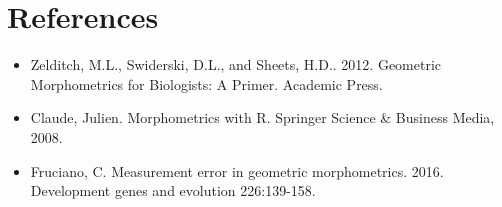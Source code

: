 \documentclass[]{book}
\providecommand{\tightlist}{%
  \setlength{\itemsep}{0pt}\setlength{\parskip}{0pt}}
\begin{document}
\section{References}\label{references-4}

\begin{itemize}
\tightlist
\item
  Zelditch, M.L., Swiderski, D.L., and Sheets, H.D.. 2012. Geometric
  Morphometrics for Biologists: A Primer. Academic Press.
\item
  Claude, Julien. Morphometrics with R. Springer Science \& Business
  Media, 2008.
\item
  Fruciano, C. Measurement error in geometric morphometrics. 2016.
  Development genes and evolution 226:139-158.
\end{itemize}
\end{document}
